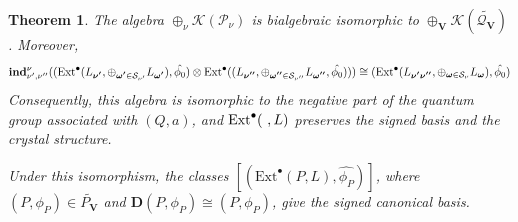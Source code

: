 \documentclass[10pt,a4paper]{amsart}
\newtheorem{theorem}{Theorem}[section]
\def\Ext{\mbox{\rm Ext}}   \def\Ker{\mbox{\rm Ker}\,}
\def\bfV{{\mathbf V}}
\def\bfV{\mathbf{V}}
\def\ind{\mathbf{ind}}
\newcommand\mk{{\mathcal{K}}}
\newcommand\mq{{\mathcal{Q}}}
\begin{document}
\begin{theorem}
The algebra $\oplus_{\nu}\mathcal{K}(\mathcal{P}_{\nu})$ is bialgebraic isomorphic to $\oplus_{\bfV}\mk(\widetilde{\mq_{\bfV}})$ \cite[Chapter 12]{lusztig2010introduction}. Moreover,
\[
\ind_{\nu',\nu''}^{\nu}((\Ext^{\bullet}(L_{\boldsymbol{\nu'}},\oplus_{\boldsymbol{\omega'}\in \mathcal{S}_{\nu'}}L_{\boldsymbol{\omega'}}),\hat{\phi_0})\otimes \Ext^{\bullet}((L_{\boldsymbol{\nu''}},\oplus_{\boldsymbol{\omega''}\in \mathcal{S}_{\nu''}}L_{\boldsymbol{\omega''}},\hat{\phi_0})))\cong (\Ext^{\bullet}(L_{\boldsymbol{\nu'\nu''}},\oplus_{\boldsymbol{\omega}\in \mathcal{S}_{\nu}}L_{\boldsymbol{\omega}}),\hat{\phi_0})
\]
Consequently, this algebra is isomorphic to the negative part of the quantum group associated with $(Q,a)$, and $\Ext^{\bullet}(\ ,L)$ preserves the signed basis and the crystal structure.

Under this isomorphism, the classes $[(\mathrm{Ext}^{\bullet}(P, L), \hat{\phi_P})]$, where $(P,\phi_P)\in \widetilde{P_{\bfV}}$ and $\mathbf{D}(P,\phi_P)\cong(P,\phi_P)$, give the signed canonical basis. 
\end{theorem}
\end{document}
